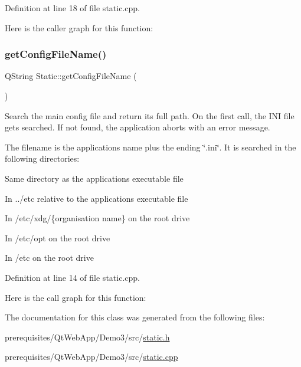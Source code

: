Definition at line 18 of file static.\+cpp.

Here is the caller graph for this function\+:
\mbox{\label{class_static_ad162fbe9bf85ea4cf5978fc61f6a0745}} 
\subsubsection{\texorpdfstring{get\+Config\+File\+Name()}{getConfigFileName()}}
{\footnotesize\ttfamily Q\+String Static\+::get\+Config\+File\+Name (\begin{DoxyParamCaption}{ }\end{DoxyParamCaption})\hspace{0.3cm}{\ttfamily [static]}}

Search the main config file and return its full path. On the first call, the I\+NI file gets searched. If not found, the application aborts with an error message. 

The filename is the applications name plus the ending \char`\"{}.\+ini\char`\"{}. It is searched in the following directories\+:


\begin{DoxyItemize}
\item Same directory as the applications executable file
\item In ../etc relative to the applications executable file
\item In /etc/xdg/\{organisation name\} on the root drive
\item In /etc/opt on the root drive
\item In /etc on the root drive 
\end{DoxyItemize}

Definition at line 14 of file static.\+cpp.

Here is the call graph for this function\+:


The documentation for this class was generated from the following files\+:\begin{DoxyCompactItemize}
\item 
prerequisites/\+Qt\+Web\+App/\+Demo3/src/\mbox{\hyperlink{static_8h}{static.\+h}}\item 
prerequisites/\+Qt\+Web\+App/\+Demo3/src/\mbox{\hyperlink{static_8cpp}{static.\+cpp}}\end{DoxyCompactItemize}
